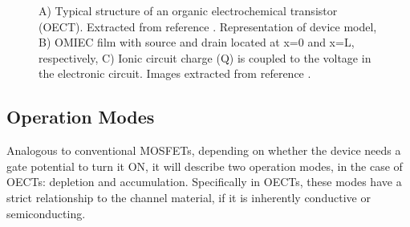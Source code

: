 \begin{figure}[ht]
	\centering
	\caption{A) Typical structure of an organic electrochemical transistor (OECT). Extracted from reference \cite{rivnayOrganicElectrochemicalTransistors2018}. Representation of device model, B) OMIEC film with source and drain located at x=0 and x=L, respectively, C) Ionic circuit charge (Q) is coupled to the voltage in the electronic circuit. Images extracted from reference \cite{bernardsSteadyStateTransientBehavior2007}.}
	\label{fig:bernard}
\end{figure}


\subsection{Operation Modes}

Analogous to conventional MOSFETs, depending on whether the device needs a gate potential to turn it ON, it will describe two operation modes, in the case of OECTs: depletion and accumulation. Specifically in OECTs, these modes have a strict relationship to the channel material, if it is inherently conductive or semiconducting.

